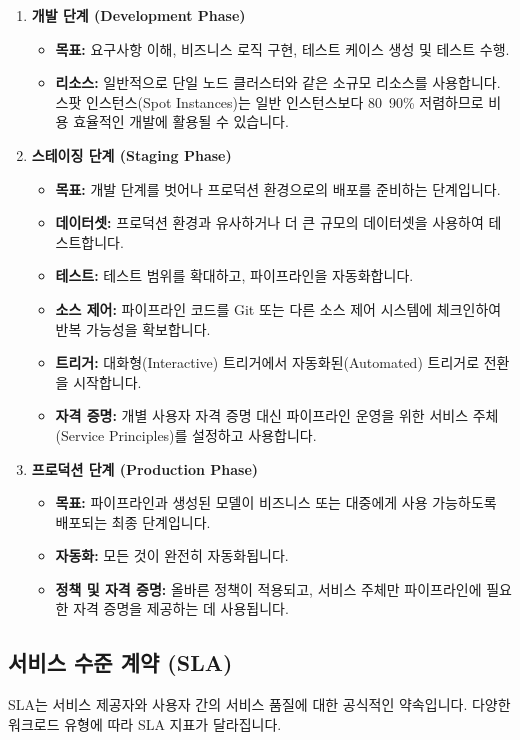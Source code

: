 \documentclass[11pt,a4paper]{article}
\begin{document}
\begin{enumerate}
    \item \textbf{개발 단계 (Development Phase)}
    \begin{itemize}
        \item \textbf{목표:} 요구사항 이해, 비즈니스 로직 구현, 테스트 케이스 생성 및 테스트 수행.
        \item \textbf{리소스:} 일반적으로 단일 노드 클러스터와 같은 소규모 리소스를 사용합니다. 스팟 인스턴스(Spot Instances)는 일반 인스턴스보다 80~90\% 저렴하므로 비용 효율적인 개발에 활용될 수 있습니다.
    \end{itemize}

    \item \textbf{스테이징 단계 (Staging Phase)}
    \begin{itemize}
        \item \textbf{목표:} 개발 단계를 벗어나 프로덕션 환경으로의 배포를 준비하는 단계입니다.
        \item \textbf{데이터셋:} 프로덕션 환경과 유사하거나 더 큰 규모의 데이터셋을 사용하여 테스트합니다.
        \item \textbf{테스트:} 테스트 범위를 확대하고, 파이프라인을 자동화합니다.
        \item \textbf{소스 제어:} 파이프라인 코드를 Git 또는 다른 소스 제어 시스템에 체크인하여 반복 가능성을 확보합니다.
        \item \textbf{트리거:} 대화형(Interactive) 트리거에서 자동화된(Automated) 트리거로 전환을 시작합니다.
        \item \textbf{자격 증명:} 개별 사용자 자격 증명 대신 파이프라인 운영을 위한 서비스 주체(Service Principles)를 설정하고 사용합니다.
    \end{itemize}

    \item \textbf{프로덕션 단계 (Production Phase)}
    \begin{itemize}
        \item \textbf{목표:} 파이프라인과 생성된 모델이 비즈니스 또는 대중에게 사용 가능하도록 배포되는 최종 단계입니다.
        \item \textbf{자동화:} 모든 것이 완전히 자동화됩니다.
        \item \textbf{정책 및 자격 증명:} 올바른 정책이 적용되고, 서비스 주체만 파이프라인에 필요한 자격 증명을 제공하는 데 사용됩니다.
    \end{itemize}
\end{enumerate}

\subsection{서비스 수준 계약 (SLA)}
SLA는 서비스 제공자와 사용자 간의 서비스 품질에 대한 공식적인 약속입니다. 다양한 워크로드 유형에 따라 SLA 지표가 달라집니다.
\end{document}
